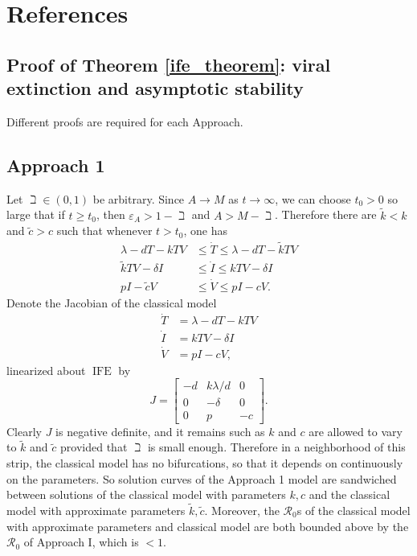 \documentclass[]{elsarticle}
\newcommand{\IFE}{\operatorname{IFE}}
\newcommand{\BRN}{\mathcal{R}_0}
\theoremstyle{definition}
\begin{document}
\section*{References}



\cleardoublepage



\begin{appendices}
\section{Proof of Theorem \ref{ife_theorem}: viral extinction and asymptotic stability}



Different proofs are required for each Approach.

\subsection{Approach 1}
\label{global1}
Let $\beth \in (0, 1)$ be arbitrary. Since $A \to M$ as $t \to \infty$, we can choose $t_0 > 0$ so large that if $t \geq t_0$, then $\varepsilon_A > 1 - \beth$ and $A > M - \beth$. Therefore there are $\tilde k < k$ and $\tilde c > c$ such that whenever $t > t_0$, one has
\begin{align*}
    \lambda - dT - kTV &\leq \dot T \leq \lambda - dT - \tilde kTV\\
    \tilde kTV - \delta I &\leq \dot I \leq kTV - \delta I\\
    pI - \tilde cV &\leq \dot V \leq pI - cV.
\end{align*}
    Denote the Jacobian of the classical model
\begin{align*}
    \dot T &= \lambda - dT - kTV\\
    \dot I &= kTV - \delta I\\
    \dot V &= pI - cV,
\end{align*}
    linearized about $\IFE$ by
    $$J = \begin{bmatrix}-d&k \lambda/d&0\\0&-\delta&0\\0&p&-c\end{bmatrix}.$$
    Clearly $J$ is negative definite, and it remains such as $k$ and $c$ are allowed to vary to $\tilde k$ and $\tilde c$ provided that $\beth$ is small enough. Therefore in a neighborhood of this strip, the classical model has no bifurcations, so that it depends on continuously on the parameters. So solution curves of the Approach 1 model are sandwiched between solutions of the classical model with parameters $k,c$ and the classical model with approximate parameters $\tilde k, \tilde c$. Moreover, the $\BRN$s of the classical model with approximate parameters and classical model are both bounded above by the $\BRN$ of Approach I, which is $< 1$.


\end{appendices}
\end{document}
